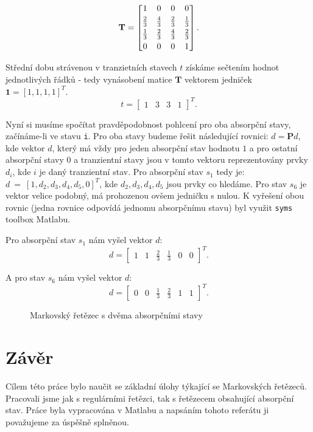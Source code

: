 \documentclass{article}
\begin{document}
\[
\mathbf{T} =
\begin{bmatrix}
1 & 0 & 0 & 0 \\
\addlinespace[3pt]
\frac{2}{3} & \frac{4}{3} & \frac{2}{3} & \frac{1}{3} \\
\addlinespace[3pt]
\frac{1}{3} & \frac{2}{3} & \frac{4}{3} & \frac{2}{3} \\
\addlinespace[3pt]
0 & 0 & 0 & 1 \\
\end{bmatrix}.
\]

Střední dobu strávenou v tranzietních stavech $t$ získáme sečtením hodnot jednotlivých řádků - tedy vynásobení matice $\mathbf{T}$ vektorem jedniček $\mathbf{1} = [1, 1, 1, 1]^T$.
\[
t = 
\begin{bmatrix}
    1 & 3 & 3 & 1
\end{bmatrix}^T.
\]

Nyní si musíme spočítat pravděpodobnost pohlcení pro oba absorpční stavy, začínáme-li ve stavu \verb|i|.
Pro oba stavy budeme řešit následující rovnici: $d = \mathbf{P} d$, kde vektor $d$, který má vždy pro jeden absorpční stav hodnotu $1$ a pro ostatní absorpční stavy $0$ a tranzientní stavy jsou v tomto vektoru reprezentovány prvky $d_i$, kde $i$ je daný tranzientní stav. 
Pro absorpční stav $s_1$ tedy je:\linebreak  $d~=~[1, d_2, d_3, d_4, d_5, 0]^T$, kde $d_2, d_3, d_4, d_5$ jsou prvky co hledáme. Pro stav $s_6$ je vektor velice podobný, má prohozenou ovšem jedničku s nulou.
K vyřešení obou rovnic (jedna rovnice odpovídá jednomu absorpčnímu stavu) byl využit \verb|syms| toolbox Matlabu.

Pro absorpční stav $s_1$ nám vyšel vektor $d$:
\[
d = 
\begin{bmatrix}
    1 & 1 &\frac 2 3 & \frac 1 3 & 0 & 0
\end{bmatrix}^T.
\]

A pro stav $s_6$ nám vyšel vektor $d$:
\[
d = 
\begin{bmatrix}
    0 & 0 & \frac 1 3 & \frac 2 3 & 1 & 1
\end{bmatrix}^T.
\]


\begin{figure}
\centering
{}
\caption{Markovský řetězec s dvěma absorpčními stavy}
\label{fig:markov_chain_2}
\end{figure}
\clearpage
\section{Závěr}
Cílem této práce bylo naučit se základní úlohy týkající se Markovských řetězeců. Pracovali jsme jak s regulárními řetězci, tak s řetězecem obsahující absorpční stav. 
Práce byla vypracována v Matlabu a napsáním tohoto referátu ji považujeme za úspěšně splněnou.
\end{document}
